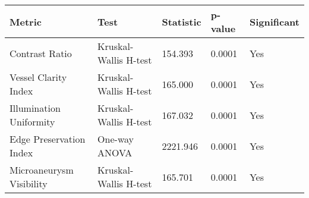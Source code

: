 \begin{tabular}{lllll}
\toprule
Metric & Test & Statistic & p-value & Significant \\
\midrule
Contrast Ratio & Kruskal-Wallis H-test & 154.393 & 0.0001 & Yes \\
Vessel Clarity Index & Kruskal-Wallis H-test & 165.000 & 0.0001 & Yes \\
Illumination Uniformity & Kruskal-Wallis H-test & 167.032 & 0.0001 & Yes \\
Edge Preservation Index & One-way ANOVA & 2221.946 & 0.0001 & Yes \\
Microaneurysm Visibility & Kruskal-Wallis H-test & 165.701 & 0.0001 & Yes \\
\bottomrule
\end{tabular}
